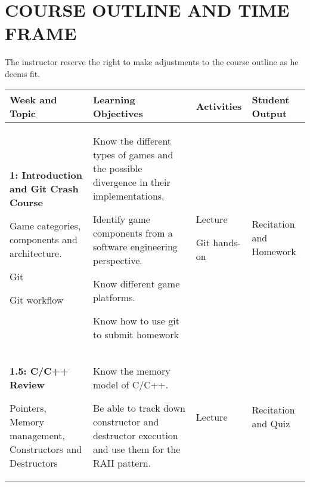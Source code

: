 \documentclass[10pt]{article}
\newenvironment{itemize*}{
\begin{itemize}[leftmargin=1em,noitemsep,nolistsep]
}{\end{itemize}}
\begin{document}
\section{COURSE OUTLINE AND TIME FRAME}
The instructor reserve the right to make adjustments to the course outline as he deems fit.
\begin{longtable}{||p{1.8in}|p{2.4in}|p{1.3in}|p{1in}||}
\hline
\textbf{Week and Topic} & \textbf{Learning Objectives} & \textbf{Activities} & \textbf{Student Output} \\ \hline

\textbf{1: Introduction and Git Crash Course}	\begin{itemize*}
		\item Game categories, components and architecture.
		\item Git
		\item Git workflow
	\end{itemize*} & \begin{itemize*}
		\item Know the different types of games and the possible divergence in their implementations.
		\item Identify game components from a software engineering perspective.
		\item Know different game platforms.
		\item Know how to use git to submit homework
	\end{itemize*} &
	\begin{itemize*}
		\item Lecture
		\item Git hands-on
	\end{itemize*} & Recitation and Homework \\ \hline
\textbf{1.5: C/C++ Review}\begin{itemize*}
		\item Pointers, Memory management, Constructors and Destructors
	\end{itemize*} & \begin{itemize*}
		\item Know the memory model of C/C++.
		\item Be able to track down constructor and destructor execution and use them for the RAII pattern.
	\end{itemize*} &
	\begin{itemize*}
		\item Lecture
	\end{itemize*} & Recitation and Quiz \\ \hline

\end{longtable}
\end{document}
